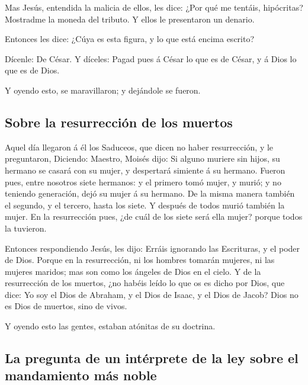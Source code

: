  Mas Jesús, entendida la malicia de ellos, les dice: ¿Por
qué me tentáis, hipócritas?  Mostradme la moneda del
tributo. Y ellos le presentaron un denario.

 Entonces les dice: ¿Cúya es esta figura, y lo que está
encima escrito?

 Dícenle: De César. Y díceles: Pagad pues á César lo que es
de César, y á Dios lo que es de Dios.

 Y oyendo esto, se maravillaron; y dejándole se fueron.

\hypertarget{sobre-la-resurrecciuxf3n-de-los-muertos}{%
\subsection{Sobre la resurrección de los
muertos}\label{sobre-la-resurrecciuxf3n-de-los-muertos}}

 Aquel día llegaron á él los Saduceos, que dicen no haber
resurrección, y le preguntaron,  Diciendo: Maestro, Moisés
dijo: Si alguno muriere sin hijos, su hermano se casará con su mujer, y
despertará simiente á su hermano.  Fueron pues, entre
nosotros siete hermanos: y el primero tomó mujer, y murió; y no teniendo
generación, dejó su mujer á su hermano.  De la misma manera
también el segundo, y el tercero, hasta los siete.  Y
después de todos murió también la mujer.  En la
resurrección pues, ¿de cuál de los siete será ella mujer? porque todos
la tuvieron.

 Entonces respondiendo Jesús, les dijo: Erráis ignorando
las Escrituras, y el poder de Dios.  Porque en la
resurrección, ni los hombres tomarán mujeres, ni las mujeres maridos;
mas son como los ángeles de Dios en el cielo.  Y de la
resurrección de los muertos, ¿no habéis leído lo que os es dicho por
Dios, que dice:  Yo soy el Dios de Abraham, y el Dios de
Isaac, y el Dios de Jacob? Dios no es Dios de muertos, sino de vivos.

 Y oyendo esto las gentes, estaban atónitas de su doctrina.

\hypertarget{la-pregunta-de-un-intuxe9rprete-de-la-ley-sobre-el-mandamiento-muxe1s-noble}{%
\subsection{La pregunta de un intérprete de la ley sobre el mandamiento
más
noble}\label{la-pregunta-de-un-intuxe9rprete-de-la-ley-sobre-el-mandamiento-muxe1s-noble}}


